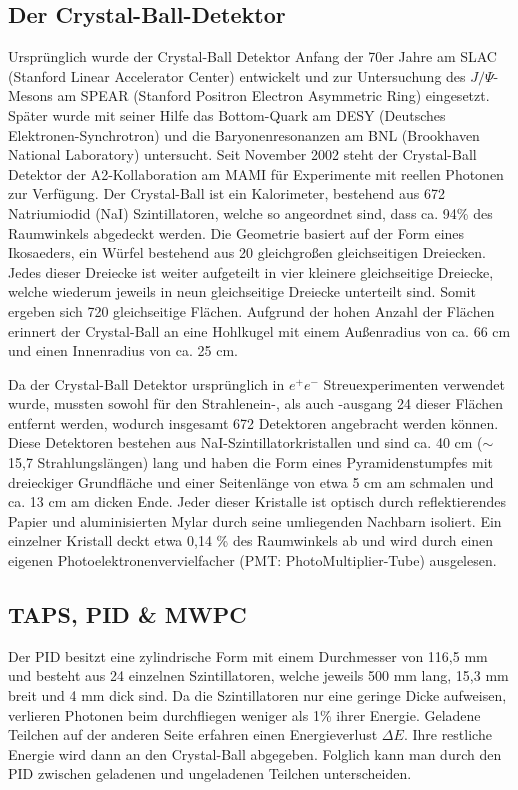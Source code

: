 \documentclass[a4paper,11pt,oneside,final,german,openbib,pdftex]{scrbook}
\begin{document}
{\subsection{Der Crystal-Ball-Detektor}
Ursprünglich wurde der Crystal-Ball Detektor Anfang der 70er Jahre am SLAC (Stanford Linear Accelerator Center) entwickelt und zur Untersuchung des $J/\Psi$-Mesons am SPEAR (Stanford Positron Electron Asymmetric Ring) eingesetzt. Später wurde mit seiner Hilfe das Bottom-Quark am DESY (Deutsches Elektronen-Synchrotron) und die Baryonenresonanzen am BNL (Brookhaven National Laboratory) untersucht.
Seit November 2002 steht der Crystal-Ball Detektor der A2-Kollaboration am MAMI für Experimente mit reellen Photonen zur Verfügung.
\newline
Der Crystal-Ball ist ein Kalorimeter, bestehend aus 672 Natriumiodid (NaI) Szintillatoren, welche so angeordnet sind, dass ca. 94\% des Raumwinkels abgedeckt werden. Die Geometrie basiert auf der Form eines Ikosaeders, ein W\"urfel bestehend aus 20 gleichgro{\ss}en gleichseitigen Dreiecken. Jedes dieser Dreiecke ist weiter aufgeteilt in vier kleinere gleichseitige Dreiecke, welche wiederum jeweils in neun gleichseitige Dreiecke unterteilt sind. Somit ergeben sich 720 gleichseitige Fl\"achen. Aufgrund der hohen Anzahl der Fl\"achen erinnert der Crystal-Ball an eine Hohlkugel mit einem Au{\ss}enradius von ca. 66 cm und einen Innenradius von ca. 25 cm. 

Da der Crystal-Ball Detektor urspr\"unglich in $e^+e^-$ Streuexperimenten verwendet wurde, mussten sowohl f\"ur den Strahlenein-, als auch -ausgang 24 dieser Fl\"achen entfernt werden, wodurch insgesamt 672 Detektoren angebracht werden k\"onnen. Diese Detektoren bestehen aus NaI-Szintillatorkristallen und sind ca. 40 cm ($\sim$15,7 Strahlungsl\"angen) lang und haben die Form eines Pyramidenstumpfes mit dreieckiger Grundfl\"ache und einer Seitenl\"ange von etwa 5 cm am schmalen und ca. 13 cm am dicken Ende. Jeder dieser Kristalle ist optisch durch reflektierendes Papier und aluminisierten Mylar durch seine umliegenden Nachbarn isoliert. Ein einzelner Kristall deckt etwa 0,14 \% des Raumwinkels ab und wird durch einen eigenen Photoelektronenvervielfacher (PMT: PhotoMultiplier-Tube) ausgelesen. 



\subsection{TAPS, PID \& MWPC}
\label{sec:TAPS-PID-MWPC}
Der PID besitzt eine zylindrische Form mit einem Durchmesser von 116,5 mm und besteht aus 24 einzelnen Szintillatoren, welche jeweils 500 mm lang, 15,3 mm breit und 4 mm dick sind. Da die Szintillatoren nur eine geringe Dicke aufweisen, verlieren Photonen beim durchfliegen weniger als 1\% ihrer Energie. Geladene Teilchen auf der anderen Seite erfahren einen Energieverlust $\Delta E$. Ihre restliche Energie wird dann an den Crystal-Ball abgegeben. Folglich kann man durch den PID zwischen geladenen und ungeladenen Teilchen unterscheiden. 

}
\end{document}

